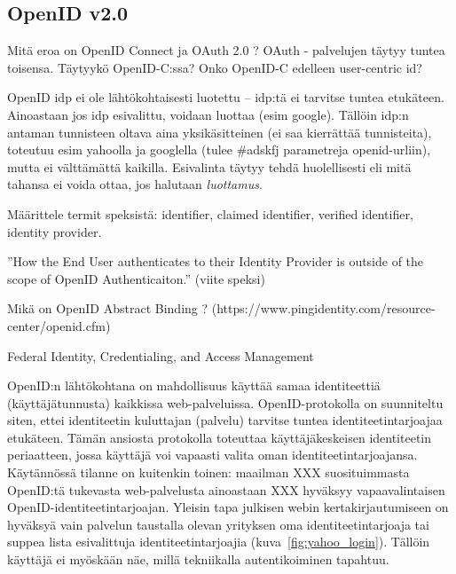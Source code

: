 \documentclass[finnish,gradu]{tktltiki}
\begin{document}
  \subsection{OpenID v2.0} %
  \label{sub:openid}
  Mitä eroa on OpenID Connect ja OAuth 2.0 ?
  OAuth - palvelujen täytyy tuntea toisensa. Täytyykö OpenID-C:ssa?
  Onko OpenID-C edelleen user-centric id?

  OpenID idp ei ole lähtökohtaisesti luotettu -- idp:tä ei tarvitse tuntea etukäteen. Ainoastaan jos idp esivalittu, voidaan luottaa (esim google). Tällöin idp:n antaman tunnisteen oltava aina yksikäsitteinen (ei saa kierrättää tunnisteita), toteutuu esim yahoolla ja googlella (tulee \#adskfj parametreja openid-urliin), mutta ei välttämättä kaikilla. Esivalinta täytyy tehdä huolellisesti eli mitä tahansa ei voida ottaa, jos halutaan \emph{luottamus}.

  Määrittele termit speksistä: identifier, claimed identifier, verified identifier, identity provider.

  ''How the End User authenticates to their Identity Provider is outside of the scope of OpenID Authenticaiton.'' (viite speksi)

  Mikä on OpenID Abstract Binding ? (https://www.pingidentity.com/resource-center/openid.cfm)

  Federal Identity, Credentialing, and Access Management %


  OpenID:n lähtökohtana on mahdollisuus käyttää samaa identiteettiä (käyttäjätunnusta) kaikkissa web-palveluissa. OpenID-protokolla on suunniteltu siten, ettei identiteetin kuluttajan (palvelu) tarvitse tuntea identiteetintarjoajaa etukäteen. Tämän ansiosta protokolla toteuttaa käyttäjäkeskeisen identiteetin periaatteen, jossa käyttäjä voi vapaasti valita oman identiteetintarjoajansa. Käytännössä tilanne on kuitenkin toinen: maailman XXX suosituimmasta OpenID:tä tukevasta web-palvelusta ainoastaan XXX hyväksyy vapaavalintaisen OpenID-identiteetintarjoajan. Yleisin tapa julkisen webin kertakirjautumiseen on hyväksyä vain palvelun taustalla olevan yrityksen oma identiteetintarjoaja tai suppea lista esivalittuja identiteetintarjoajia (kuva~\ref{fig:yahoo_login}). Tällöin käyttäjä ei myöskään näe, millä tekniikalla autentikoiminen tapahtuu.
\end{document}
